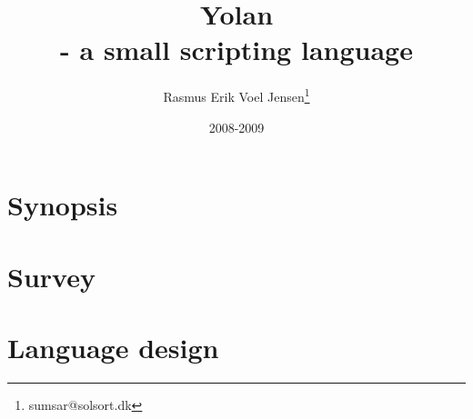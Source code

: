 \documentclass[12pt]{report}
\title{Yolan \\ - a small scripting language}
\author{
  Rasmus Erik Voel Jensen\footnote{
    sumsar@solsort.dk
  }
}
\date{2008-2009}
\begin{document}


\nocite{sicp}

\chapter*{Synopsis}

\chapter{Survey}

\chapter{Language design}



\end{document}
